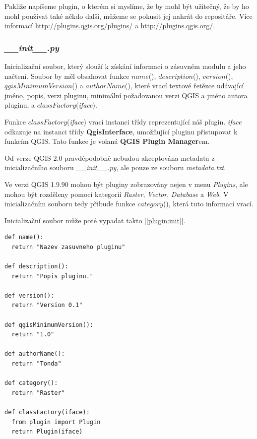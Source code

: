 Pakliže napíšeme plugin, o kterém si myslíme, že by mohl být užitečný, že by ho mohl používat také někdo další, můžeme se pokusit jej nahrát do repositáře. Více informací \url{http://plugins.qgis.org/plugins/} a \url{http://plugins.qgis.org/}.

\subsubsection*{\textit{\_\_init\_\_.py}}
Inicializační soubor, který slouží k získání informací o zásuvném modulu a jeho načtení. Soubor by měl obsahovat funkce $name$(), $description$(), $version$(),\newline $qgisMinimumVersion$() a $authorName$(), které vrací textové řetězce udávající jméno, popis, verzi pluginu, minimální požadovanou verzi QGIS a jméno autora pluginu, a $classFactory$(\textit{iface}).

Funkce $classFactory$(\textit{iface}) vrací instanci třídy reprezentující náš plugin. \textit{iface} odkazuje na instanci třídy \textbf{QgisInterface}, umožňující pluginu přistupovat k funkcím QGIS. Tato funkce je volaná \textbf{QGIS Plugin Manager}em.

Od verze QGIS 2.0 pravděpodobně nebudou akceptována metadata z inicializačního souboru \textit{\_\_init\_\_.py}, ale pouze ze souboru \textit{metadata.txt}.

Ve verzi QGIS 1.9.90 mohou být pluginy zobrazovány nejen v menu \textit{Plugins}, ale mohou být rozděleny pomocí kategorií \textit{Raster}, \textit{Vector}, \textit{Database} a \textit{Web}. V inicializačním souboru tedy přibude funkce $category$(), která tuto informací vrací.

Inicializační soubor může poté vypadat takto [\autoref{plugin:init}]. \\

\begin{lstlisting}[caption={\_\_init\_\_.py - inicializační soubor},label=plugin:init]
def name():
  return "Nazev zasuvneho pluginu"

def description():
  return "Popis pluginu."

def version():
  return "Version 0.1"

def qgisMinimumVersion():
  return "1.0"

def authorName():
  return "Tonda"

def category():
  return "Raster"

def classFactory(iface):
  from plugin import Plugin
  return Plugin(iface)
\end{lstlisting}

